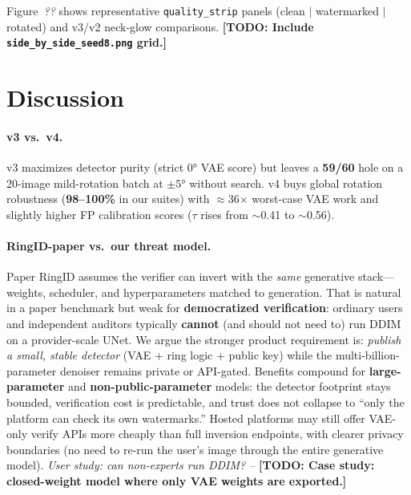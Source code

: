 \documentclass[11pt,a4paper]{article}
\newcommand{\placeholder}[1]{\textcolor{gray!70!black}{\textit{#1}}}
\newcommand{\todo}[1]{\textcolor{red!70!black}{\textbf{[TODO: #1]}}}
\begin{document}
Figure~\placeholder{??} shows representative \texttt{quality\_strip} panels (clean $|$ watermarked $|$ rotated) and v3/v2 neck-glow comparisons.
\todo{Include \texttt{side\_by\_side\_seed8.png} grid.}

\section{Discussion}

\paragraph{v3 vs.\ v4.}
v3 maximizes detector purity (strict 0° VAE score) but leaves a \textbf{59/60} hole on a 20-image mild-rotation batch at $\pm5°$ without search.
v4 buys global rotation robustness (\textbf{98--100\%} in our suites) with $\approx$36$\times$ worst-case VAE work and slightly higher FP calibration scores ($\tau$ rises from $\sim$0.41 to $\sim$0.56).

\paragraph{RingID-paper vs.\ our threat model.}
Paper RingID assumes the verifier can invert with the \emph{same} generative stack---weights, scheduler, and hyperparameters matched to generation.
That is natural in a paper benchmark but weak for \textbf{democratized verification}: ordinary users and independent auditors typically \textbf{cannot} (and should not need to) run DDIM on a provider-scale UNet.
We argue the stronger product requirement is: \emph{publish a small, stable detector} (VAE + ring logic + public key) while the multi-billion-parameter denoiser remains private or API-gated.
Benefits compound for \textbf{large-parameter} and \textbf{non-public-parameter} models: the detector footprint stays bounded, verification cost is predictable, and trust does not collapse to ``only the platform can check its own watermarks.''
Hosted platforms may still offer VAE-only verify APIs more cheaply than full inversion endpoints, with clearer privacy boundaries (no need to re-run the user's image through the entire generative model).
\placeholder{User study: can non-experts run DDIM? --}
\todo{Case study: closed-weight model where only VAE weights are exported.}
\end{document}

